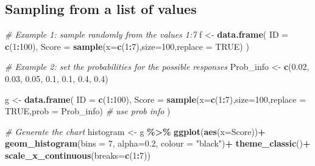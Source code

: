 \documentclass[
]{book}
\newenvironment{Shaded}{\begin{snugshade}}{\end{snugshade}}
\newcommand{\AttributeTok}[1]{\textcolor[rgb]{0.13,0.29,0.53}{#1}}
\newcommand{\CommentTok}[1]{\textcolor[rgb]{0.56,0.35,0.01}{\textit{#1}}}
\newcommand{\ConstantTok}[1]{\textcolor[rgb]{0.56,0.35,0.01}{#1}}
\newcommand{\DecValTok}[1]{\textcolor[rgb]{0.00,0.00,0.81}{#1}}
\newcommand{\FloatTok}[1]{\textcolor[rgb]{0.00,0.00,0.81}{#1}}
\newcommand{\FunctionTok}[1]{\textcolor[rgb]{0.13,0.29,0.53}{\textbf{#1}}}
\newcommand{\NormalTok}[1]{#1}
\newcommand{\OtherTok}[1]{\textcolor[rgb]{0.56,0.35,0.01}{#1}}
\newcommand{\SpecialCharTok}[1]{\textcolor[rgb]{0.81,0.36,0.00}{\textbf{#1}}}
\newcommand{\StringTok}[1]{\textcolor[rgb]{0.31,0.60,0.02}{#1}}
\begin{document}
\subsection*{Sampling from a list of values}\label{sampling-from-a-list-of-values}

\begin{Shaded}
\begin{Highlighting}[]
\CommentTok{\# Example 1: sample randomly from the values 1:7}
\NormalTok{f }\OtherTok{\textless{}{-}} \FunctionTok{data.frame}\NormalTok{(}
  \AttributeTok{ID =} \FunctionTok{c}\NormalTok{(}\DecValTok{1}\SpecialCharTok{:}\DecValTok{100}\NormalTok{),}
  \AttributeTok{Score =} \FunctionTok{sample}\NormalTok{(}\AttributeTok{x=}\FunctionTok{c}\NormalTok{(}\DecValTok{1}\SpecialCharTok{:}\DecValTok{7}\NormalTok{),}\AttributeTok{size=}\DecValTok{100}\NormalTok{,}\AttributeTok{replace =} \ConstantTok{TRUE}\NormalTok{)}
\NormalTok{)}


\CommentTok{\# Example 2: set the probabilities for the possible responses}
\NormalTok{Prob\_info }\OtherTok{\textless{}{-}} \FunctionTok{c}\NormalTok{(}\FloatTok{0.02}\NormalTok{, }\FloatTok{0.03}\NormalTok{, }\FloatTok{0.05}\NormalTok{, }\FloatTok{0.1}\NormalTok{, }\FloatTok{0.1}\NormalTok{, }\FloatTok{0.4}\NormalTok{, }\FloatTok{0.4}\NormalTok{)}

\NormalTok{g }\OtherTok{\textless{}{-}} \FunctionTok{data.frame}\NormalTok{(}
  \AttributeTok{ID =} \FunctionTok{c}\NormalTok{(}\DecValTok{1}\SpecialCharTok{:}\DecValTok{100}\NormalTok{),}
  \AttributeTok{Score =} \FunctionTok{sample}\NormalTok{(}\AttributeTok{x=}\FunctionTok{c}\NormalTok{(}\DecValTok{1}\SpecialCharTok{:}\DecValTok{7}\NormalTok{),}\AttributeTok{size=}\DecValTok{100}\NormalTok{,}\AttributeTok{replace =} \ConstantTok{TRUE}\NormalTok{,}\AttributeTok{prob =}\NormalTok{ Prob\_info) }\CommentTok{\# use prob info}
\NormalTok{)}

\CommentTok{\# Generate the chart}
\NormalTok{histogram }\OtherTok{\textless{}{-}}\NormalTok{ g }\SpecialCharTok{\%\textgreater{}\%}
  \FunctionTok{ggplot}\NormalTok{(}\FunctionTok{aes}\NormalTok{(}\AttributeTok{x=}\NormalTok{Score))}\SpecialCharTok{+}
  \FunctionTok{geom\_histogram}\NormalTok{(}\AttributeTok{bins =} \DecValTok{7}\NormalTok{, }\AttributeTok{alpha=}\FloatTok{0.2}\NormalTok{, }\AttributeTok{colour =} \StringTok{"black"}\NormalTok{)}\SpecialCharTok{+}
  \FunctionTok{theme\_classic}\NormalTok{()}\SpecialCharTok{+}
  \FunctionTok{scale\_x\_continuous}\NormalTok{(}\AttributeTok{breaks=}\FunctionTok{c}\NormalTok{(}\DecValTok{1}\SpecialCharTok{:}\DecValTok{7}\NormalTok{))}


\end{Highlighting}
\end{Shaded}
\end{document}
